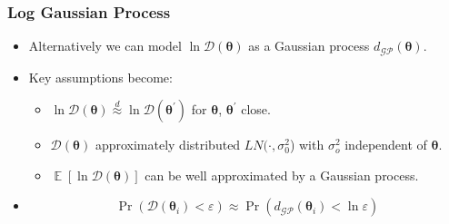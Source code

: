 \documentclass{beamer}
\DeclareMathOperator{\E}{\mathbb{E}}
\begin{document}
\begin{frame}
    \frametitle{Log Gaussian Process}
    \begin{itemize}
        \item Alternatively we can model $\ln \mathcal{D}(\bm{\theta})$ as a
              Gaussian process $d_\mathcal{GP}(\bm{\theta}).$
        \item <2-> Key assumptions become:
              \begin{itemize}
                  \item $\ln \mathcal{D}(\bm{\theta})
                            \overset{d}{\approx} \ln \mathcal{D}(\bm{\theta}^\prime)$ for
                        $\bm{\theta}$, $\bm{\theta}^\prime$ close.
                  \item $\mathcal{D}(\bm{\theta})$ approximately distributed
                        $LN(\cdot, \sigma^2_0$) with $\sigma^2_o$ independent of
                        $\bm{\theta}.$
                  \item $\E[\ln \mathcal{D}(\bm{\theta})]$ can be well approximated by a
                        Gaussian process.
              \end{itemize}
        \item <3- >$$
                  \Pr(\mathcal{D}(\bm{\theta}_i) < \varepsilon)
                  \approx \Pr(d_\mathcal{GP}(\bm{\theta}_i) < \ln\varepsilon)
              $$
    \end{itemize}


\end{frame}
\end{document}

